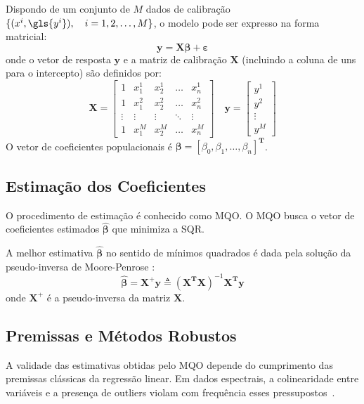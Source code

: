 Dispondo de um conjunto de $M$ dados de calibração $\{(x^i,\gls{y^i}), \quad i = 1,2,\ldots,M \}$, o modelo pode ser expresso na forma matricial:
\begin{equation}
    \mathbf{y} = \mathbf{X}\mathbf{\beta} + \mathbf{\varepsilon}
\end{equation}
onde o vetor de resposta $\mathbf{y}$ e a matriz de calibração $\mathbf{X}$ (incluindo a coluna de uns para o intercepto) são definidos por:
\begin{equation}
    \mathbf{X} =
    \left[\begin{array}{ccccc}
    1 & x_{1}^1 & x_{2}^1 & \ldots & x_{n}^1 \\
    1 & x_{1}^2 & x_{2}^2 & \ldots & x_{n}^2 \\
    \vdots & \vdots & \vdots & \ddots & \vdots \\
    1 & x_{1}^M & x_{2}^M & \ldots & x_{n}^M
    \end{array}\right]
    \quad \mathbf{y} =
    \left[\begin{array}{c}
    y^1\\y^2\\\vdots \\y^M
    \end{array}\right]
\end{equation}
O vetor de coeficientes populacionais é $\mathbf{\beta} = [\beta_0, \beta_1, \ldots, \beta_n]^{\textbf{T}}$.

\subsection{Estimação dos Coeficientes}
O procedimento de estimação é conhecido como \gls{MQO}. O MQO busca o vetor de coeficientes estimados $\widehat{\mathbf{\beta}}$ que minimiza a \gls{SQR}.

A melhor estimativa $\widehat{\mathbf{\beta}}$ no sentido de mínimos quadrados é dada pela solução da pseudo-inversa de Moore-Penrose \cite{DRAPER:1998,TIMM:2002}:
\begin{equation}
    \label{eq:rlm-pseudo}
    \widehat{\mathbf{\beta}} = \mathbf{X}^+ \mathbf{y} \triangleq (\mathbf{X}^{\textbf{T}} \mathbf{X})^{-1} \mathbf{X}^{\textbf{T}} \mathbf{y}
\end{equation}
onde $\mathbf{X}^{+}$ é a pseudo-inversa da matriz $\mathbf{X}$.


\subsection{Premissas e Métodos Robustos}
A validade das estimativas obtidas pelo MQO depende do cumprimento das premissas clássicas da regressão linear. Em dados espectrais, a colinearidade entre variáveis e a presença de outliers violam com frequência esses pressupostos~\cite{Alin2017,Filzmoser2013}.

